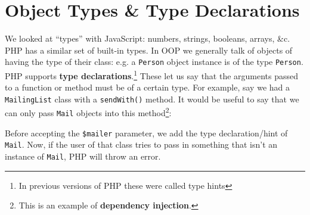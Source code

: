 \section{Object Types \& Type Declarations}

We looked at ``types'' with JavaScript: numbers, strings, booleans, arrays, \&c. PHP has a similar set of built-in types. In OOP we generally talk of objects of having the type of their class: e.g. a \texttt{Person} object instance is of the type \texttt{Person}.
\\

PHP supports \textbf{type declarations}.\footnote{In previous versions of PHP these were called type hints} These let us say that the arguments passed to a function or method must be of a certain type. For example, say we had a \texttt{MailingList} class with a \texttt{sendWith()} method. It would be useful to say that we can only pass \texttt{Mail} objects into this method\footnote{This is an example of \textbf{dependency injection}.}:


Before accepting the \texttt{\$mailer} parameter, we add the type declaration/hint of \texttt{Mail}. Now, if the user of that class tries to pass in something that isn't an instance of \texttt{Mail}, PHP will throw an error.

